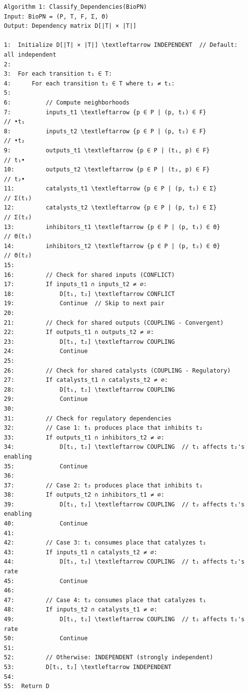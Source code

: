 \begin{lstlisting}
Algorithm 1: Classify_Dependencies(BioPN)
Input: BioPN = (P, T, F, Σ, Θ)
Output: Dependency matrix D[|T| × |T|]

1:  Initialize D[|T| × |T|] \textleftarrow INDEPENDENT  // Default: all independent
2:  
3:  For each transition t₁ ∈ T:
4:      For each transition t₂ ∈ T where t₂ ≠ t₁:
5:          
6:          // Compute neighborhoods
7:          inputs_t1 \textleftarrow {p ∈ P | (p, t₁) ∈ F}           // •t₁
8:          inputs_t2 \textleftarrow {p ∈ P | (p, t₂) ∈ F}           // •t₂
9:          outputs_t1 \textleftarrow {p ∈ P | (t₁, p) ∈ F}          // t₁•
10:         outputs_t2 \textleftarrow {p ∈ P | (t₂, p) ∈ F}          // t₂•
11:         catalysts_t1 \textleftarrow {p ∈ P | (p, t₁) ∈ Σ}        // Σ(t₁)
12:         catalysts_t2 \textleftarrow {p ∈ P | (p, t₂) ∈ Σ}        // Σ(t₂)
13:         inhibitors_t1 \textleftarrow {p ∈ P | (p, t₁) ∈ Θ}       // Θ(t₁)
14:         inhibitors_t2 \textleftarrow {p ∈ P | (p, t₂) ∈ Θ}       // Θ(t₂)
15:         
16:         // Check for shared inputs (CONFLICT)
17:         If inputs_t1 ∩ inputs_t2 ≠ ∅:
18:             D[t₁, t₂] \textleftarrow CONFLICT
19:             Continue  // Skip to next pair
20:         
21:         // Check for shared outputs (COUPLING - Convergent)
22:         If outputs_t1 ∩ outputs_t2 ≠ ∅:
23:             D[t₁, t₂] \textleftarrow COUPLING
24:             Continue
25:         
26:         // Check for shared catalysts (COUPLING - Regulatory)
27:         If catalysts_t1 ∩ catalysts_t2 ≠ ∅:
28:             D[t₁, t₂] \textleftarrow COUPLING
29:             Continue
30:         
31:         // Check for regulatory dependencies
32:         // Case 1: t₁ produces place that inhibits t₂
33:         If outputs_t1 ∩ inhibitors_t2 ≠ ∅:
34:             D[t₁, t₂] \textleftarrow COUPLING  // t₁ affects t₂'s enabling
35:             Continue
36:         
37:         // Case 2: t₂ produces place that inhibits t₁
38:         If outputs_t2 ∩ inhibitors_t1 ≠ ∅:
39:             D[t₁, t₂] \textleftarrow COUPLING  // t₂ affects t₁'s enabling
40:             Continue
41:         
42:         // Case 3: t₁ consumes place that catalyzes t₂
43:         If inputs_t1 ∩ catalysts_t2 ≠ ∅:
44:             D[t₁, t₂] \textleftarrow COUPLING  // t₁ affects t₂'s rate
45:             Continue
46:         
47:         // Case 4: t₂ consumes place that catalyzes t₁
48:         If inputs_t2 ∩ catalysts_t1 ≠ ∅:
49:             D[t₁, t₂] \textleftarrow COUPLING  // t₂ affects t₁'s rate
50:             Continue
51:         
52:         // Otherwise: INDEPENDENT (strongly independent)
53:         D[t₁, t₂] \textleftarrow INDEPENDENT
54:  
55:  Return D
\end{lstlisting}

